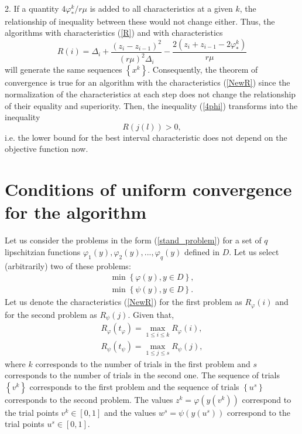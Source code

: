 \documentclass[smallcondensed]{svjour3}     %
\begin{document}
2. If a quantity $4\varphi_\ast^k/r\mu$  is added to all characteristics at a given $k$, the relationship of inequality between these would not change either.
Thus, the algorithms with characteristics (\ref{R}) and with characteristics
\begin{equation}\label{NewR}
R(i)=\Delta_i+\frac{(z_i-z_{i-1})^2}{(r\mu)^2\Delta_i}-\frac{2(z_i+z_{i-1}-2\varphi_\ast^k)}{r\mu}
\end{equation}
will generate the same sequences $\left\{x^k\right\}$. Consequently, the theorem of convergence is true for an algorithm with the characteristics (\ref{NewR}) since the normalization of the characteristics at each step does not change the relationship of their equality and superiority. Then, the inequality (\ref{4phi}) transforms into the inequality
\begin{equation}\label{zero}
R(j(l))>0,
\end{equation}
i.e. the lower bound for the best interval characteristic does not depend on the objective function now.

\section{Conditions of uniform convergence for the algorithm}

Let us consider the problems in the form  (\ref{stand_problem}) for a set of $q$ lipschitzian functions $\varphi_1(y), \varphi_2(y),...,\varphi_q(y)$ defined in $D$. Let us select (arbitrarily) two of these problems:
\begin{eqnarray} \label{two_problems}
\min\left\{\varphi(y), y\in D\right\}, \\ \nonumber
\min\left\{\psi(y), y\in D\right\}. \nonumber
\end{eqnarray}
Let us denote the characteristics (\ref{NewR}) for the first problem as $R_\varphi(i)$ and for the second problem as $R_\psi(j)$. Given that, 
\begin{eqnarray} \nonumber
R_\varphi(t_\varphi)= \max_{1 \leq i \leq k}R_\varphi(i), \\ \nonumber
R_\psi(t_\psi)= \max_{1 \leq j \leq s}R_\psi(j), \nonumber
\end{eqnarray}
where $k$ corresponds to the number of trials in the first problem and $s$ corresponds to the number of trials in the second one. The sequence of trials $\left\{v^k\right\}$ corresponds to the first problem and the sequence of trials $\left\{u^s\right\}$ corresponds to the second problem. The values $z^k=\varphi (y(v^k))$ correspond to the trial points $v^k\in [0,1]$ and the values $w^s=\psi(y(u^s))$ correspond to the trial points $u^s \in [0,1]$.
\end{document}

